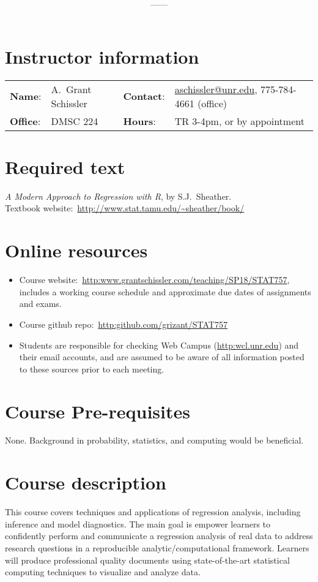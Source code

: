 \documentclass[11pt,onecolumn]{article}
\title{\textbf{\coursename}}
\author{{\semester}---{\roomnumb}---{\classtimes}}
\date{}
\makeatletter
\newcommand{\myname}{A.~Grant Schissler}
\newcommand{\myemail}{aschissler@unr.edu}
\newcommand{\office}{DMSC 224}
\newcommand{\officehours}{TR 3-4pm, or by appointment}
\makeatother
\begin{document}
\maketitle


\section*{Instructor information}

\begin{tabular}{llll}
\textbf{Name}:&\myname & \textbf{Contact}:&\href{mailto:\myemail}{\myemail}, 775-784-4661 (office)\\
\textbf{Office}:&\office & \textbf{Hours}:&\officehours\\
\end{tabular}

\section*{Required text}
\emph{A Modern Approach to Regression with R}, by S.J.~Sheather. \\
Textbook website:~\url{http://www.stat.tamu.edu/~sheather/book/}

\section*{Online resources}
\begin{itemize}
\item Course website:~\url{http:www.grantschissler.com/teaching/SP18/STAT757}, includes a working course schedule and approximate due dates of assignments and exams.
\item Course github repo:~\url{http:github.com/grizant/STAT757}
\item Students are responsible for checking Web Campus (\url{http:wcl.unr.edu}) and their email accounts, and are assumed to be aware of all information posted to these sources prior to each meeting.
\end{itemize}

\section*{Course Pre-requisites}
None. Background in probability, statistics, and computing would be beneficial.

\section*{Course description}
This course covers techniques and applications of regression analysis, including inference and model diagnostics. The main goal is empower learners to confidently perform and communicate a regression analysis of real data to address research questions in a reproducible analytic/computational framework. Learners will produce professional quality documents using state-of-the-art statistical computing techniques to visualize and analyze data.
\end{document}
